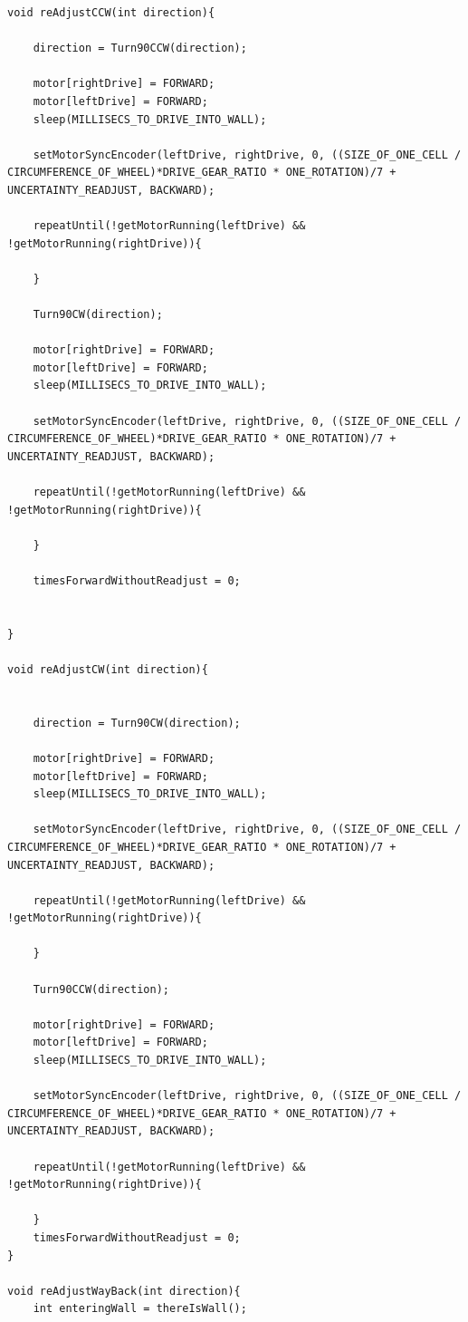 \documentclass[11pt]{article}
\begin{document}
\begin{verbatim}
void reAdjustCCW(int direction){

	direction = Turn90CCW(direction);

	motor[rightDrive] = FORWARD;
	motor[leftDrive] = FORWARD;
	sleep(MILLISECS_TO_DRIVE_INTO_WALL);

	setMotorSyncEncoder(leftDrive, rightDrive, 0, ((SIZE_OF_ONE_CELL / CIRCUMFERENCE_OF_WHEEL)*DRIVE_GEAR_RATIO * ONE_ROTATION)/7 + UNCERTAINTY_READJUST, BACKWARD);

	repeatUntil(!getMotorRunning(leftDrive) && !getMotorRunning(rightDrive)){

	}

	Turn90CW(direction);

	motor[rightDrive] = FORWARD;
	motor[leftDrive] = FORWARD;
	sleep(MILLISECS_TO_DRIVE_INTO_WALL);

	setMotorSyncEncoder(leftDrive, rightDrive, 0, ((SIZE_OF_ONE_CELL / CIRCUMFERENCE_OF_WHEEL)*DRIVE_GEAR_RATIO * ONE_ROTATION)/7 + UNCERTAINTY_READJUST, BACKWARD);

	repeatUntil(!getMotorRunning(leftDrive) && !getMotorRunning(rightDrive)){

	}

	timesForwardWithoutReadjust = 0;


}

void reAdjustCW(int direction){


	direction = Turn90CW(direction);

	motor[rightDrive] = FORWARD;
	motor[leftDrive] = FORWARD;
	sleep(MILLISECS_TO_DRIVE_INTO_WALL);

	setMotorSyncEncoder(leftDrive, rightDrive, 0, ((SIZE_OF_ONE_CELL / CIRCUMFERENCE_OF_WHEEL)*DRIVE_GEAR_RATIO * ONE_ROTATION)/7 + UNCERTAINTY_READJUST, BACKWARD);

	repeatUntil(!getMotorRunning(leftDrive) && !getMotorRunning(rightDrive)){

	}

	Turn90CCW(direction);

	motor[rightDrive] = FORWARD;
	motor[leftDrive] = FORWARD;
	sleep(MILLISECS_TO_DRIVE_INTO_WALL);

	setMotorSyncEncoder(leftDrive, rightDrive, 0, ((SIZE_OF_ONE_CELL / CIRCUMFERENCE_OF_WHEEL)*DRIVE_GEAR_RATIO * ONE_ROTATION)/7 + UNCERTAINTY_READJUST, BACKWARD);

	repeatUntil(!getMotorRunning(leftDrive) && !getMotorRunning(rightDrive)){

	}
	timesForwardWithoutReadjust = 0;
}

void reAdjustWayBack(int direction){
	int enteringWall = thereIsWall();


\end{verbatim}
\end{document}
